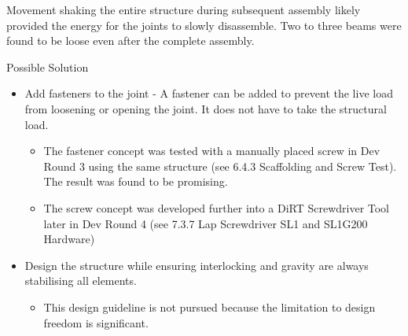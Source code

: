 Movement shaking the entire structure during subsequent assembly likely provided the energy for the joints to slowly disassemble. Two to three beams were found to be loose even after the complete assembly. 

Possible Solution
\begin{itemize}
    \item Add fasteners to the joint - A fastener can be added to prevent the live load from loosening or opening the joint. It does not have to take the structural load.
    \begin{itemize}
        \item The fastener concept was tested with a manually placed screw in Dev Round 3 using the same structure (see 6.4.3 Scaffolding and Screw Test). The result was found to be promising.
        \item The screw concept was developed further into a DiRT Screwdriver Tool later in Dev Round 4 (see 7.3.7 Lap Screwdriver SL1 and SL1\textunderscore G200 Hardware)
    \end{itemize}
    \item Design the structure while ensuring interlocking and gravity are always stabilising all elements. 
    \begin{itemize}
        \item This design guideline is not pursued because the limitation to design freedom is significant. 
    \end{itemize}
\end{itemize}

